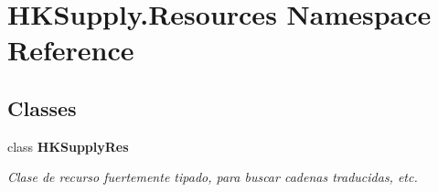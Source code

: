\hypertarget{namespace_h_k_supply_1_1_resources}{}\section{H\+K\+Supply.\+Resources Namespace Reference}
\label{namespace_h_k_supply_1_1_resources}
\subsection*{Classes}
\begin{DoxyCompactItemize}
\item 
class {\bfseries H\+K\+Supply\+Res}
\begin{DoxyCompactList}\small\item\em Clase de recurso fuertemente tipado, para buscar cadenas traducidas, etc. \end{DoxyCompactList}\end{DoxyCompactItemize}
